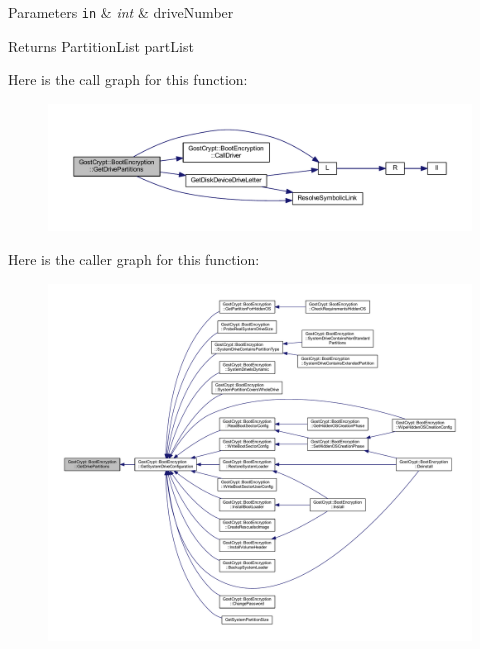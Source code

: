 \begin{DoxyParams}[1]{Parameters}
\mbox{\tt in}  & {\em int} & drive\+Number \\
\hline
\end{DoxyParams}
\begin{DoxyReturn}{Returns}
Partition\+List part\+List 
\end{DoxyReturn}
Here is the call graph for this function\+:
\nopagebreak
\begin{figure}[H]
\begin{center}
\leavevmode
\includegraphics[width=350pt]{class_gost_crypt_1_1_boot_encryption_a3043ae06af0b4d63e45806ddc1458006_cgraph}
\end{center}
\end{figure}
Here is the caller graph for this function\+:
\nopagebreak
\begin{figure}[H]
\begin{center}
\leavevmode
\includegraphics[width=350pt]{class_gost_crypt_1_1_boot_encryption_a3043ae06af0b4d63e45806ddc1458006_icgraph}
\end{center}
\end{figure}
\mbox{\label{class_gost_crypt_1_1_boot_encryption_ae710a86e41ba731cf231fad660dc16a9}} 
